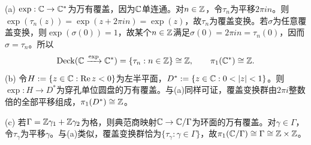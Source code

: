 (a) $\exp:\mathbb C\to\mathbb C^*$为万有覆盖，因为$\mathbb C$单连通。对$n\in\mathbb Z$，令$\tau_n$为平移$2\pi in$。则$\exp(\tau_n(z))=\exp(z+2\pi in)=\exp(z)$，故$\tau_n$为覆盖变换。若$\sigma$为任意覆盖变换，则$\exp(\sigma(0))=1$，故某个$n\in\mathbb Z$满足$\sigma(0)=2\pi in=\tau_n(0)$，因而$\sigma=\tau_n$。所以
\[
\operatorname{Deck}(\mathbb C\xrightarrow{\exp}\mathbb C^*)=\{\tau_n:n\in\mathbb Z\}\cong\mathbb Z,\qquad\pi_1(\mathbb C^*)\cong\mathbb Z.
\]
(b) 令$H:=\{z\in\mathbb C:\operatorname{Re}z<0\}$为左半平面，$D^*:=\{z\in\C:0<|z|<1\}$。则$\exp:H\to D^*$为穿孔单位圆盘的万有覆盖。与(a)同样可证，覆盖变换群由$2\pi i$整数倍的全部平移组成，$\pi_1(D^*)\cong\mathbb Z$。

(c) 若$\Gamma=\mathbb Z\gamma_1+\mathbb Z\gamma_2$为格，则典范商映射$\mathbb C\to\mathbb C/\Gamma$为环面的万有覆盖。对$\gamma\in\Gamma$，令$\tau_\gamma$为平移$\gamma$。与(a)类似，覆盖变换群恰为$\{\tau_\gamma:\gamma\in\Gamma\}$，故$\pi_1(\mathbb C/\Gamma)\cong\Gamma\cong\mathbb Z\times\mathbb Z$。

